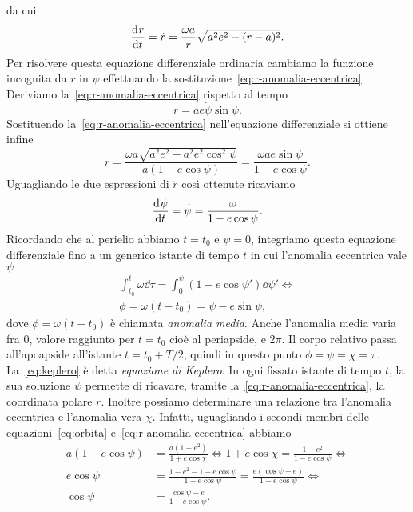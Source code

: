 da cui
\begin{equation}
  \frac{{\mathop{}\!\mathrm{d}^{}}r}{\mathop{}\!\mathrm{d} {t}^{}} = \dot{r} = \frac{\omega a}{r}\sqrt{a^2e^2 - (r-a)^2}.
\end{equation}
Per risolvere questa equazione differenziale ordinaria cambiamo la funzione
incognita da $r$ in $\psi$ effettuando la
sostituzione~\eqref{eq:r-anomalia-eccentrica}. Deriviamo
la~\eqref{eq:r-anomalia-eccentrica} rispetto al tempo
\begin{equation}
  \dot{r} = ae\dot{\psi}\sin\psi.
\end{equation}
Sostituendo la~\eqref{eq:r-anomalia-eccentrica} nell'equazione differenziale si
ottiene infine
\begin{equation}
  r = \frac{\omega a\sqrt{a^2e^2 - a^2e^2\cos^2\psi}}{a(1-e\cos\psi)} =
  \frac{\omega ae\sin\psi}{1-e\cos\psi}.
\end{equation}
Uguagliando le due espressioni di $\dot{r}$ così ottenute ricaviamo
\begin{equation}
  \frac{{\mathop{}\!\mathrm{d}^{}}\psi}{\mathop{}\!\mathrm{d} {t}^{}} = \dot{\psi} = \frac{\omega}{1-e\cos\psi}.
\end{equation}
Ricordando che al perielio abbiamo $t = t_0$ e $\psi = 0$, integriamo questa
equazione differenziale fino a un generico istante di tempo $t$ in cui
l'anomalia eccentrica vale $\psi$
\begin{gather}
  \int_{t_0}^t \omega\dd \tau = \int_0^\psi(1-e\cos\psi')\dd \psi' \iff\\
  \phi = \omega(t - t_0) = \psi - e\sin\psi, \label{eq:keplero}
\end{gather}
dove $\phi = \omega(t-t_0)$ è chiamata \emph{anomalia media}. Anche l'anomalia
media varia fra $0$, valore raggiunto per $t = t_0$ cioè al periapside, e
$2\pi$. Il corpo relativo passa all'apoapside all'istante $t = t_0 + T/2$,
quindi in questo punto $\phi = \psi = \chi = \pi$. La~\eqref{eq:keplero} è detta
\emph{equazione di Keplero}. In ogni fissato istante di tempo $t$, la sua
soluzione $\psi$ permette di ricavare, tramite
la~\eqref{eq:r-anomalia-eccentrica}, la coordinata polare $r$. Inoltre possiamo
determinare una relazione tra l'anomalia eccentrica e l'anomalia vera $\chi$.
Infatti, uguagliando i secondi membri delle equazioni~\eqref{eq:orbita}
e~\eqref{eq:r-anomalia-eccentrica} abbiamo
\begin{equation}
  \begin{aligned}
    a(1-e\cos\psi) &= \frac{a(1-e^2)}{1+e\cos\chi} \iff 1+e\cos\chi =
    \frac{1-e^2}{1-e\cos\psi} \iff \\
    e\cos\psi &= \frac{1-e^2-1+e\cos\psi}{1-e\cos\psi} =
    \frac{e(\cos\psi-e)}{1-e\cos\psi} \iff \\
    \cos\psi &= \frac{\cos\psi-e}{1-e\cos\psi}.
  \end{aligned}
\end{equation}
